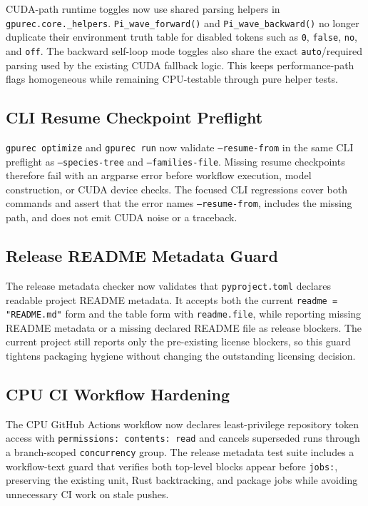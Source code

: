\documentclass[11pt]{article}
\begin{document}
CUDA-path runtime toggles now use shared parsing helpers in
\texttt{gpurec.core.\_helpers}.  \texttt{Pi\_wave\_forward()} and
\texttt{Pi\_wave\_backward()} no longer duplicate their environment truth table
for disabled tokens such as \texttt{0}, \texttt{false}, \texttt{no}, and
\texttt{off}.  The backward self-loop mode toggles also share the exact
\texttt{auto}/required parsing used by the existing CUDA fallback logic.  This
keeps performance-path flags homogeneous while remaining CPU-testable through
pure helper tests.

\subsection{CLI Resume Checkpoint Preflight}

\texttt{gpurec optimize} and \texttt{gpurec run} now validate
\texttt{--resume-from} in the same CLI preflight as \texttt{--species-tree}
and \texttt{--families-file}.  Missing resume checkpoints therefore fail with
an argparse error before workflow execution, model construction, or CUDA device
checks.  The focused CLI regressions cover both commands and assert that the
error names \texttt{--resume-from}, includes the missing path, and does not
emit CUDA noise or a traceback.

\subsection{Release README Metadata Guard}

The release metadata checker now validates that \texttt{pyproject.toml}
declares readable project README metadata.  It accepts both the current
\texttt{readme = "README.md"} form and the table form with
\texttt{readme.file}, while reporting missing README metadata or a missing
declared README file as release blockers.  The current project still reports
only the pre-existing license blockers, so this guard tightens packaging
hygiene without changing the outstanding licensing decision.

\subsection{CPU CI Workflow Hardening}

The CPU GitHub Actions workflow now declares least-privilege repository token
access with \texttt{permissions: contents: read} and cancels superseded runs
through a branch-scoped \texttt{concurrency} group.  The release metadata test
suite includes a workflow-text guard that verifies both top-level blocks appear
before \texttt{jobs:}, preserving the existing unit, Rust backtracking, and
package jobs while avoiding unnecessary CI work on stale pushes.
\end{document}
